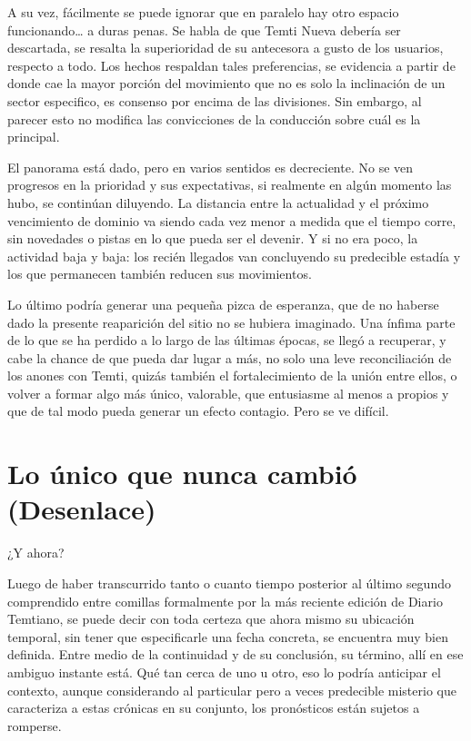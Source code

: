 \documentclass[
  spanish,
]{book}
\begin{document}
A su vez, fácilmente se puede ignorar que en paralelo hay otro espacio funcionando\ldots{} a duras penas. Se habla de que Temti Nueva debería ser descartada, se resalta la superioridad de su antecesora a gusto de los usuarios, respecto a todo. Los hechos respaldan tales preferencias, se evidencia a partir de donde cae la mayor porción del movimiento que no es solo la inclinación de un sector especifico, es consenso por encima de las divisiones. Sin embargo, al parecer esto no modifica las convicciones de la conducción sobre cuál es la principal.

El panorama está dado, pero en varios sentidos es decreciente. No se ven progresos en la prioridad y sus expectativas, si realmente en algún momento las hubo, se continúan diluyendo. La distancia entre la actualidad y el próximo vencimiento de dominio va siendo cada vez menor a medida que el tiempo corre, sin novedades o pistas en lo que pueda ser el devenir. Y si no era poco, la actividad baja y baja: los recién llegados van concluyendo su predecible estadía y los que permanecen también reducen sus movimientos.

Lo último podría generar una pequeña pizca de esperanza, que de no haberse dado la presente reaparición del sitio no se hubiera imaginado. Una ínfima parte de lo que se ha perdido a lo largo de las últimas épocas, se llegó a recuperar, y cabe la chance de que pueda dar lugar a más, no solo una leve reconciliación de los anones con Temti, quizás también el fortalecimiento de la unión entre ellos, o volver a formar algo más único, valorable, que entusiasme al menos a propios y que de tal modo pueda generar un efecto contagio. Pero se ve difícil.

\hypertarget{lo-uxfanico-que-nunca-cambiuxf3-desenlace}{%
\chapter{Lo único que nunca cambió (Desenlace)}\label{lo-uxfanico-que-nunca-cambiuxf3-desenlace}}

¿Y ahora?

Luego de haber transcurrido tanto o cuanto tiempo posterior al último segundo comprendido entre comillas formalmente por la más reciente edición de Diario Temtiano, se puede decir con toda certeza que ahora mismo su ubicación temporal, sin tener que especificarle una fecha concreta, se encuentra muy bien definida. Entre medio de la continuidad y de su conclusión, su término, allí en ese ambiguo instante está. Qué tan cerca de uno u otro, eso lo podría anticipar el contexto, aunque considerando al particular pero a veces predecible misterio que caracteriza a estas crónicas en su conjunto, los pronósticos están sujetos a romperse.
\end{document}
